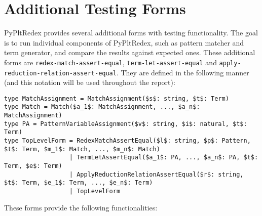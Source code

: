 \section{Additional Testing Forms}

PyPltRedex provides several additional forms with testing functionality. The goal is to run individual components of PyPltRedex, such as pattern matcher and term generator, and compare the results against expected ones. These additional forms are \texttt{redex-match-assert-equal}, \texttt{term-let-assert-equal} and \texttt{apply-reduction-relation-assert-equal}. They are defined in the following manner (and this notation will be used throughout the report):

\begin{lstlisting}
type MatchAssignment = MatchAssignment($s$: string, $t$: Term)
type Match = Match($a_1$: MatchAssignment, ..., $a_n$: MatchAssignment)
type PA = PatternVariableAssignment($v$: string, $i$: natural, $t$: Term)
type TopLevelForm = RedexMatchAssertEqual($l$: string, $p$: Pattern, $t$: Term, $m_1$: Match, ..., $m_n$: Match)
                  | TermLetAssertEqual($a_1$: PA, ..., $a_n$: PA, $t$: Term, $e$: Term)
                  | ApplyReductionRelationAssertEqual($r$: string, $t$: Term, $e_1$: Term, ..., $e_n$: Term)
                  | TopLevelForm
\end{lstlisting}

These forms provide the following functionalities:

